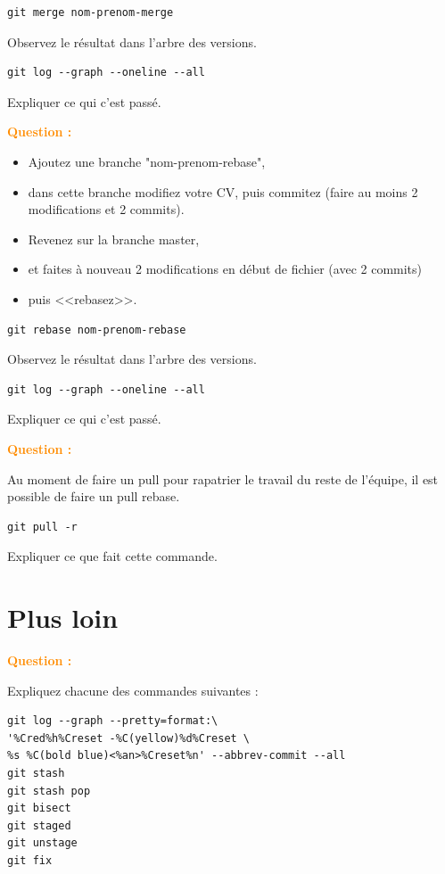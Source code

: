 \documentclass[a4paper]{article}
\newcounter{question}
\newcommand{\q}{
  \textcolor{DarkOrange}{\textbf{Question \thequestion : }}
  \addtocounter{question}{1}
  \newline
}
\begin{document}
\begin{verbatim}
git merge nom-prenom-merge
\end{verbatim}

Observez le résultat dans l'arbre des versions. 
\begin{verbatim}
git log --graph --oneline --all
\end{verbatim}

Expliquer ce qui c'est passé.

\q
\begin{itemize}
  \item Ajoutez une branche "nom-prenom-rebase", 
  \item dans cette branche modifiez votre CV, puis commitez (faire au moins 2 modifications et 2 commits). 
  \item Revenez sur la branche master, 
  \item et faites à nouveau 2 modifications en début de fichier (avec 2 commits) 
  \item puis <<rebasez>>.
\end{itemize}
\begin{verbatim}
git rebase nom-prenom-rebase
\end{verbatim}

Observez le résultat dans l'arbre des versions. 
\begin{verbatim}
git log --graph --oneline --all
\end{verbatim}

Expliquer ce qui c'est passé.

\q Au moment de faire un pull pour rapatrier le travail du reste de l'équipe, il est possible de faire un pull rebase.

\begin{verbatim}
git pull -r
\end{verbatim}
Expliquer ce que fait cette commande.

\section*{Plus loin}

\q Expliquez chacune des commandes suivantes :
\begin{verbatim}
git log --graph --pretty=format:\
'%Cred%h%Creset -%C(yellow)%d%Creset \
%s %C(bold blue)<%an>%Creset%n' --abbrev-commit --all
git stash 
git stash pop
git bisect
git staged
git unstage
git fix 
\end{verbatim}
\end{document}
